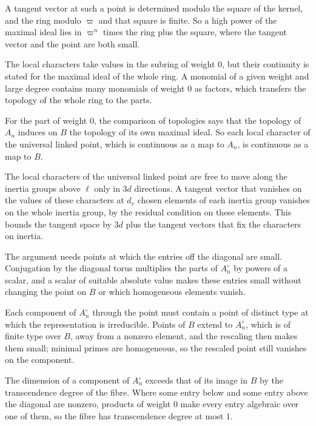 A tangent vector at such a point is determined modulo the square of the kernel, and the ring modulo $\varpi$ and that square is finite. So a high power of the maximal ideal lies in $\varpi^n$ times the ring plus the square, where the tangent vector and the point are both small.

The local characters take values in the subring of weight $0$, but their continuity is stated for the maximal ideal of the whole ring. A monomial of a given weight and large degree contains many monomials of weight $0$ as factors, which transfers the topology of the whole ring to the parts.

For the part of weight $0$, the comparison of topologies says that the topology of $A_n$ induces on $B$ the topology of its own maximal ideal. So each local character of the universal linked point, which is continuous as a map to $A_n$, is continuous as a map to $B$.

The local characters of the universal linked point are free to move along the inertia groups above $\ell$ only in $3d$ directions. A tangent vector that vanishes on the values of these characters at $d_v$ chosen elements of each inertia group vanishes on the whole inertia group, by the residual condition on these elements. This bounds the tangent space by $3d$ plus the tangent vectors that fix the characters on inertia.

The argument needs points at which the entries off the diagonal are small. Conjugation by the diagonal torus multiplies the parts of $A_n^\circ$ by powers of a scalar, and a scalar of suitable absolute value makes these entries small without changing the point on $B$ or which homogeneous elements vanish.

Each component of $A_n^\circ$ through the point must contain a point of distinct type at which the representation is irreducible. Points of $B$ extend to $A_n^\circ$, which is of finite type over $B$, away from a nonzero element, and the rescaling then makes them small; minimal primes are homogeneous, so the rescaled point still vanishes on the component.

The dimension of a component of $A_n^\circ$ exceeds that of its image in $B$ by the transcendence degree of the fibre. Where some entry below and some entry above the diagonal are nonzero, products of weight $0$ make every entry algebraic over one of them, so the fibre has transcendence degree at most $1$.

